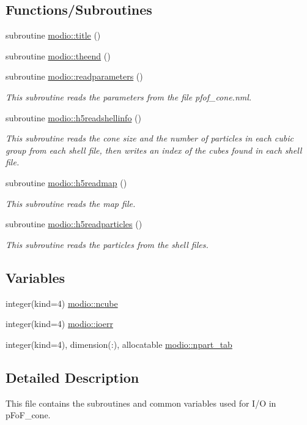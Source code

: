 \subsection*{Functions/\+Subroutines}
\begin{DoxyCompactItemize}
\item 
subroutine \hyperlink{namespacemodio_aefab9476e94da81a75351dbeee74e623}{modio\+::title} ()
\item 
subroutine \hyperlink{namespacemodio_a2688770b2d08498c14ef3212e61d74bf}{modio\+::theend} ()
\item 
subroutine \hyperlink{namespacemodio_aa5e6b5f45cf8cfc091e8e7ff25a97c68}{modio\+::readparameters} ()
\begin{DoxyCompactList}\small\item\em This subroutine reads the parameters from the file pfof\+\_\+cone.\+nml. \end{DoxyCompactList}\item 
subroutine \hyperlink{namespacemodio_a5f1cc94eaee9d1f4f7bdca4cb63ee5bc}{modio\+::h5readshellinfo} ()
\begin{DoxyCompactList}\small\item\em This subroutine reads the cone size and the number of particles in each cubic group from each shell file, then writes an index of the cubes found in each shell file. \end{DoxyCompactList}\item 
subroutine \hyperlink{namespacemodio_a0d3522f20c353a57b002c3120bc266f2}{modio\+::h5readmap} ()
\begin{DoxyCompactList}\small\item\em This subroutine reads the map file. \end{DoxyCompactList}\item 
subroutine \hyperlink{namespacemodio_a8f70f66bd5285c807b17e0c89a6e0e4a}{modio\+::h5readparticles} ()
\begin{DoxyCompactList}\small\item\em This subroutine reads the particles from the shell files. \end{DoxyCompactList}\end{DoxyCompactItemize}
\subsection*{Variables}
\begin{DoxyCompactItemize}
\item 
integer(kind=4) \hyperlink{namespacemodio_af7ac0e60c49f16bf08605237dd728508}{modio\+::ncube}
\item 
integer(kind=4) \hyperlink{namespacemodio_a62b213d7b9f52071f903b877ee52c86b}{modio\+::ioerr}
\item 
integer(kind=4), dimension(\+:), allocatable \hyperlink{namespacemodio_a0bb05c9005df17b314c2a7e0f43e758c}{modio\+::npart\+\_\+tab}
\end{DoxyCompactItemize}


\subsection{Detailed Description}
This file contains the subroutines and common variables used for I/O in p\+Fo\+F\+\_\+cone. 

